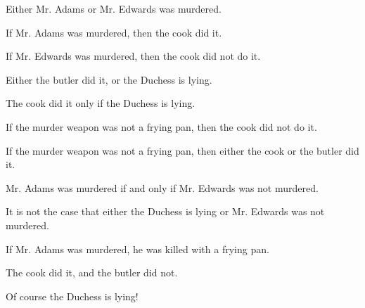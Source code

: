 \begin{earg}
\item Either Mr. Adams or Mr. Edwards was murdered.
\item If Mr. Adams was murdered, then the cook did it.
\item If Mr. Edwards was murdered, then the cook did not do it.
\item Either the butler did it, or the Duchess is lying.
\item The cook did it only if the Duchess is lying. 
\item If the murder weapon was not a frying pan, then the cook did not do it.
\item If the murder weapon was not a frying pan, then either the cook or the butler did it.
\item Mr. Adams was murdered if and only if Mr. Edwards was not murdered.
\item It is not the case that either the Duchess is lying or Mr. Edwards was not murdered.
\item If Mr. Adams was murdered, he was killed with a frying pan.
\item The cook did it, and the butler did not.
\item Of course the Duchess is lying!
\end{earg}


